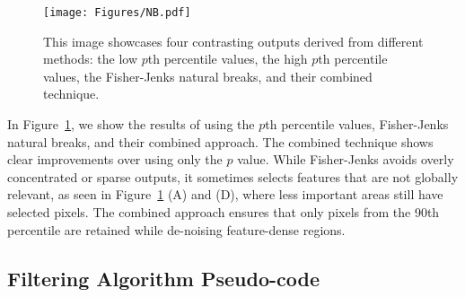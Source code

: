 \begin{figure}[ht!]
	\begin{center}
		\texttt{[image: Figures/NB.pdf]}
	\end{center}
	\caption{This image showcases four contrasting outputs derived from different methods: the low \( p \)th percentile values, the high \( p \)th percentile values, the Fisher-Jenks natural breaks, and their combined technique.}
	\label{Fig:NB}
\end{figure}

In Figure~\ref{Fig:NB}, we show the results of using the \( p \)th percentile values, Fisher-Jenks natural breaks, and their combined approach. The combined technique shows clear improvements over using only the \( p \) value. While Fisher-Jenks avoids overly concentrated or sparse outputs, it sometimes selects features that are not globally relevant, as seen in Figure~\ref{Fig:NB} (A) and (D), where less important areas still have selected pixels. The combined approach ensures that only pixels from the 90th percentile are retained while de-noising feature-dense regions.


\subsection{Filtering Algorithm Pseudo-code}



